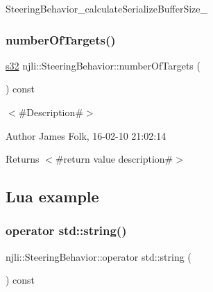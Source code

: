 \begin{DoxyCodeInclude}
\end{DoxyCodeInclude}
Steering\+Behavior\+\_\+calculate\+Serialize\+Buffer\+Size\+\_\+ \mbox{\label{classnjli_1_1_steering_behavior_a068ffa3f1d80389b134c22955695f800}} 
\subsubsection{\texorpdfstring{number\+Of\+Targets()}{numberOfTargets()}}
{\footnotesize\ttfamily \mbox{\hyperlink{_util_8h_aa62c75d314a0d1f37f79c4b73b2292e2}{s32}} njli\+::\+Steering\+Behavior\+::number\+Of\+Targets (\begin{DoxyParamCaption}{ }\end{DoxyParamCaption}) const}



$<$\#\+Description\#$>$ 

\begin{DoxyAuthor}{Author}
James Folk, 16-\/02-\/10 21\+:02\+:14
\end{DoxyAuthor}
\begin{DoxyReturn}{Returns}
$<$\#return value description\#$>$
\end{DoxyReturn}
\hypertarget{classnjli_1_1_steering_behavior_wander_ex1}{}\subsection{Lua example}\label{classnjli_1_1_steering_behavior_wander_ex1}

\begin{DoxyCodeInclude}
\end{DoxyCodeInclude}
\mbox{\label{classnjli_1_1_steering_behavior_acd7af46e42a8a3fc1208a47f50836ac8}} 
\subsubsection{\texorpdfstring{operator std\+::string()}{operator std::string()}}
{\footnotesize\ttfamily njli\+::\+Steering\+Behavior\+::operator std\+::string (\begin{DoxyParamCaption}{ }\end{DoxyParamCaption}) const\hspace{0.3cm}{\ttfamily [virtual]}}



